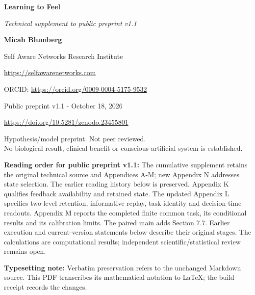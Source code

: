 \documentclass[
  american,
  11pt,
  letterpaper,
]{article}
\author{}
\date{}
\begin{document}
\begin{center}
{\LARGE\bfseries Learning to Feel\par}
\vspace{0.35em}
{\large\itshape Technical supplement to public preprint v1.1\par}
\vspace{0.8em}
{\small\textbf{Micah Blumberg}\par}
{\small Self Aware Networks Research Institute\par}
{\small\url{https://selfawarenetworks.com}\par}
{\small ORCID: \url{https://orcid.org/0009-0004-5175-9532}\par}
{\small Public preprint v1.1 - October 18, 2026\par}
{\small\url{https://doi.org/10.5281/zenodo.23455801}\par}
\end{center}

\begin{center}\small
Hypothesis/model preprint. Not peer reviewed.\\
No biological result, clinical benefit or conscious artificial system is established.
\end{center}

\textbf{Reading order for public preprint v1.1:} The cumulative supplement retains the original technical source and Appendices A-M; new Appendix N addresses state selection. The earlier reading history below is preserved. Appendix K qualifies feedback availability and retained state. The updated Appendix L specifies two-level retention, informative replay, task identity and decision-time readouts. Appendix M reports the completed finite common task, its conditional results and its calibration limits. The paired main adds Section 7.7. Earlier execution and current-version statements below describe their original stages. The calculations are computational results; independent scientific/statistical review remains open.

\textbf{Typesetting note:} Verbatim preservation refers to the unchanged Markdown source. This PDF transcribes its mathematical notation to LaTeX; the build receipt records the changes.
\end{document}
